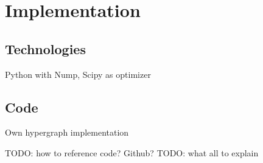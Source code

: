 \chapter{Implementation}\label{chapter:implementation}

\section{Technologies}
Python with Nump,  Scipy as optimizer


\section{Code}
Own hypergraph implementation

TODO: how to reference code? Github?
TODO: what all to explain